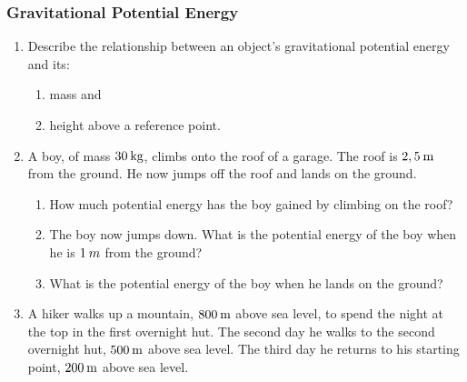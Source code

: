 \label{m38784*secfhsst!!!underscore!!!id1025}
            \subsubsection{  Gravitational Potential Energy }
            \nopagebreak
            
      \label{m38784*id66588}\begin{enumerate}[noitemsep, label=\textbf{\arabic*}. ] 
            \label{m38784*uid50}\item Describe the relationship between an object's gravitational potential energy and its:
\label{m38784*id66604}\begin{enumerate}[noitemsep, label=\textbf{\alph*}. ] 
            \label{m38784*uid51}\item mass and
\label{m38784*uid52}\item height above a reference point.
\end{enumerate}
                \label{m38784*uid53}\item A boy, of mass \begin{math}30\phantom{\rule{2pt}{0ex}}\mathrm{kg}\end{math}, climbs onto the roof of a garage. The roof is \begin{math}2,5\phantom{\rule{2pt}{0ex}}\mathrm{m}\end{math} from the ground. He now jumps off the roof and lands on the ground.
\label{m38784*id66646}\begin{enumerate}[noitemsep, label=\textbf{\alph*}. ] 
            \label{m38784*uid54}\item How much potential energy has the boy gained by climbing on the roof?
\label{m38784*uid55}\item The boy now jumps down. What is the potential energy of the boy when he is \begin{math}1\phantom{\rule{2pt}{0ex}}m\end{math} from the ground?
\label{m38784*uid56}\item What is the potential energy of the boy when he lands on the ground?
\end{enumerate}
                \label{m38784*uid57}\item A hiker walks up a mountain, \begin{math}800\phantom{\rule{2pt}{0ex}}\mathrm{m}\end{math} above sea level, to spend the night at the top in the first overnight hut. The second day he walks to the second overnight hut, \begin{math}500\phantom{\rule{2pt}{0ex}}\mathrm{m}\end{math} above sea level. The third day he returns to his starting point, \begin{math}200\phantom{\rule{2pt}{0ex}}\mathrm{m}\end{math} above sea level.

\end{enumerate}
